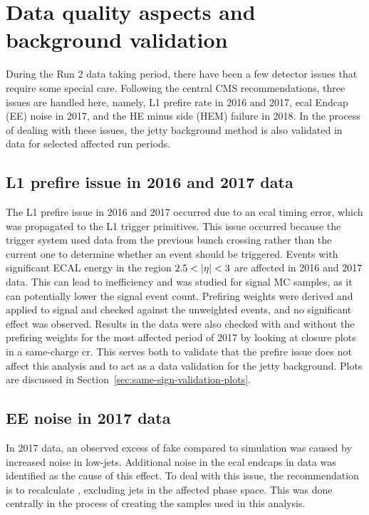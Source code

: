 \clearpage
\section{Data quality aspects and background validation}
\label{sec:data-quality}

During the Run 2 data taking period, there have been a few detector issues that require some special care. Following the central CMS recommendations, three issues are handled here, namely, L1 prefire rate in 2016 and 2017, \gls{ecal} Endcap (EE) noise in 2017, and the HE minus side (HEM) failure in 2018. In the process of dealing with these issues, the jetty background method is also validated in data for selected affected run periods. 

\subsection{L1 prefire issue in 2016 and 2017 data}

The L1 prefire issue in 2016 and 2017 occurred due to an \gls{ecal} timing error, which was propagated to the L1 trigger primitives. This issue occurred because the trigger system used data from the previous bunch crossing rather than the current one to determine whether an event should be triggered. Events with significant ECAL energy in the region $2.5<\abs{\eta}<3$ are affected in 2016 and 2017 data. This can lead to inefficiency and was studied for signal MC samples, as it can potentially lower the signal event count. Prefiring weights were derived and applied to signal and checked against the unweighted events, and no significant effect was observed. Results in the data were also checked with and without the prefiring weights for the most affected period of 2017 by looking at closure plots in a same-charge \gls{cr}. This serves both to validate that the prefire issue does not affect this analysis and to act as a data validation for the jetty background. Plots are discussed in Section~\ref{sec:same-sign-validation-plots}.

\subsection{EE noise in 2017 data}

In 2017 data, an observed excess of fake \ptmiss compared to simulation was caused by increased noise in low-\pt jets. Additional noise in the \gls{ecal} endcaps in data was identified as the cause of this effect. To deal with this issue, the recommendation is to recalculate \ptmiss, excluding jets in the affected phase space. This was done centrally in the process of creating the samples used in this analysis.

